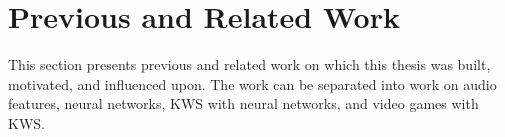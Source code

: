 
\chapter{Previous and Related Work}\label{sec:prev}
This section presents previous and related work on which this thesis was built, motivated, and influenced upon.
The work can be separated into work on audio features, neural networks, KWS with neural networks, and video games with KWS.







